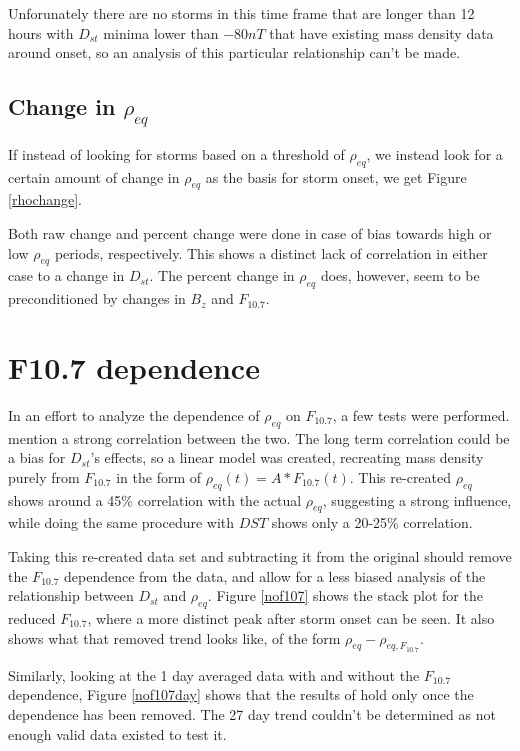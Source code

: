 \documentclass[10pt,twocolumn]{article}
\begin{document}
Unforunately there are no storms in this time frame that are longer than 12 hours with $D_{st}$ minima lower than $-80nT$ that have existing mass density data around onset, so an analysis of this particular relationship can't be made.

\subsection{Change in $\rho_{eq}$}
If instead of looking for storms based on a threshold of $\rho_{eq}$, we instead look for a certain amount of change in $\rho_{eq}$ as the basis for storm onset, we get Figure \ref{rhochange}.



Both raw change and percent change were done in case of bias towards high or low $\rho_{eq}$ periods, respectively. This shows a distinct lack of correlation in either case to a change in $D_{st}$. The percent change in $\rho_{eq}$ does, however, seem to be preconditioned by changes in $B_z$ and $F_{10.7}$.



\section{F10.7 dependence}
In an effort to analyze the dependence of $\rho_{eq}$ on $F_{10.7}$, a few tests were performed. \cite{Takahashi2010} mention a strong correlation between the two. The long term correlation could be a bias for $D_{st}$'s effects, so a linear model was created, recreating mass density purely from $F_{10.7}$ in the form of $\rho_{eq}(t)=A*F_{10.7}(t)$. This re-created $\rho_{eq}$ shows around a 45\% correlation with the actual $\rho_{eq}$, suggesting a strong influence, while doing the same procedure with $DST$ shows only a 20-25\% correlation. 

Taking this re-created data set and subtracting it from the original should remove the $F_{10.7}$ dependence from the data, and allow for a less biased analysis of the relationship between $D_{st}$ and $\rho_{eq}$. Figure \ref{nof107} shows the stack plot for the reduced $F_{10.7}$, where a more distinct peak after storm onset can be seen. It also shows what that removed trend looks like, of the form $\rho_{eq}-\rho_{eq,F_{10.7}}$.



Similarly, looking at the 1 day averaged data with and without the $F_{10.7}$ dependence, Figure \ref{nof107day} shows that the results of \cite{Takahashi2010} hold only once the dependence has been removed. The 27 day trend couldn't be determined as not enough valid data existed to test it.
\end{document}
